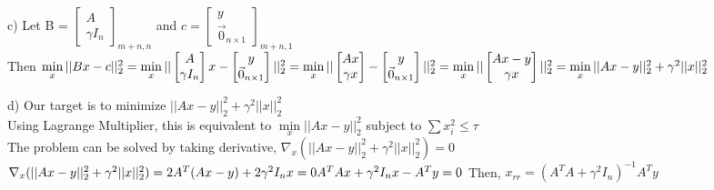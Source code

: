 \documentclass[11pt]{article}
\begin{document}
  c) Let B = $\begin{bmatrix}
  A\\ \gamma I_n
  \end{bmatrix}_{m+n,n}$ and $c = \begin{bmatrix}
  	y\\ \vec{0}_{n\times1}
  \end{bmatrix}_{m+n,1}$\\
  Then $\min\limits_{x} ||Bx -c||_2^2 = \min\limits_{x} ||\begin{bmatrix}
  A\\ \gamma I_n
  \end{bmatrix}x -  \begin{bmatrix}
  y\\ \vec{0}_{n\times1}
  \end{bmatrix} ||^2_2 =  \min\limits_{x} ||\begin{bmatrix}
  Ax\\ \gamma x
  \end{bmatrix} -  \begin{bmatrix}
  y\\ \vec{0}_{n\times1}
  \end{bmatrix} ||^2_2 \\ =  \min\limits_{x} ||\begin{bmatrix}
  Ax - y\\ \gamma x
  \end{bmatrix}  ||^2_2 =  \min\limits_{x}  ||Ax-y||^2_2 + \gamma^2 ||x||^2_2 $\\
  \pagebreak
  
  d) Our target is to minimize $||Ax-y||^2_2 + \gamma^2 ||x||^2_2 $\\
  Using Lagrange Multiplier, this is equivalent to  $\min\limits_{x}  ||Ax-y||^2_2$ subject to $\sum x_i^2 \leq \tau$\\
  The problem can be solved by taking derivative, $\nabla_x ( ||Ax-y||^2_2 + \gamma^2 ||x||^2_2) = 0$ \\
$\nabla_x ( ||Ax-y||^2_2 + \gamma^2 ||x||^2_2) = 2A^T(Ax-y)+2\gamma^2 I_n x = 0\\ A^TAx +\gamma^2 I_n x- A^Ty = 0\\$ Then, $ x_{rr} = (A^TA+\gamma^2 I_n)^{-1} A^Ty $\\
	
\end{document}
